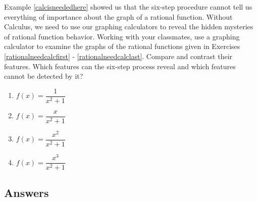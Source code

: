 Example \ref{calcisneededhere} showed us that the six-step procedure cannot tell us everything of importance about the graph of a rational function.  Without Calculus, we need to use our graphing calculators to reveal the hidden mysteries of rational function behavior.  Working with your classmates, use a graphing calculator to examine the graphs of the rational functions given in Exercises \ref{rationalneedcalcfirst} - \ref{rationalneedcalclast}.  Compare and contrast their features.  Which features can the six-step process reveal and which features cannot be detected by it?

\begin{multicols}{4}
\begin{enumerate}
\setcounter{enumi}{\value{HW}}

\item $f(x) = \dfrac{1}{x^{2} + 1}$   \label{rationalneedcalcfirst}
\item $f(x) = \dfrac{x}{x^{2} + 1}$ 
\item $f(x) = \dfrac{x^{2}}{x^{2} + 1}$ 
\item $f(x) = \dfrac{x^{3}}{x^{2} + 1}$  \label{rationalneedcalclast}

\setcounter{HW}{\value{enumi}}
\end{enumerate}
\end{multicols}

\newpage

\subsection{Answers}

